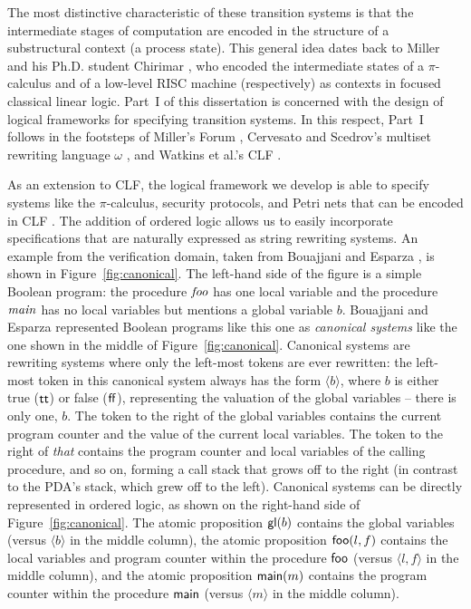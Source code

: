 The most distinctive characteristic of these transition systems is
that the intermediate stages of computation are encoded in the
structure of a substructural context (a process state). This general
idea dates back to Miller \cite{miller92pi} and his Ph.D. student
Chirimar \cite{chirimar95proof}, who encoded the intermediate states
of a $\pi$-calculus and of a low-level RISC machine (respectively) as
contexts in focused classical linear logic.  Part~I of this dissertation
is
concerned with the design of logical frameworks for specifying
transition systems.  In this respect, Part~I follows
in the footsteps of Miller's Forum \cite{miller96forum}, Cervesato and
Scedrov's multiset rewriting language $\omega$
\cite{cervesato09relating}, and Watkins et al.'s CLF
\cite{watkins02concurrent}. 



As an extension to CLF, the logical framework we develop is able to
specify systems like the $\pi$-calculus, security protocols, and Petri
nets that can be encoded in CLF \cite{cervesato02concurrent}. The
addition of ordered logic allows us to easily incorporate
specifications that are naturally expressed as string rewriting
systems.
%
An example from
the verification domain, taken from Bouajjani and Esparza
\cite{bouajjani06rewriting}, is shown in Figure~\ref{fig:canonical}.
The left-hand side of the figure is a simple Boolean program: the
procedure ${\it foo}$ has one local variable and the procedure ${\it
  main}$ has no local variables but mentions a global variable $b$.
Bouajjani and Esparza represented Boolean programs like this one as
{\it canonical systems} like the one shown in the middle of
Figure~\ref{fig:canonical}. Canonical systems are rewriting systems
where only the left-most tokens are ever rewritten: the left-most
token in this canonical system always has the form $\langle b \rangle$,
where $b$ is either true (${\sf tt}$) or false (${\sf ff}$),
representing the valuation of the global variables -- there is only 
one, $b$.  The token to the
right of the global variables contains the current program counter and
the value of the current local variables. The token to the right of
{\it that} contains the program counter and local variables of the calling
procedure, and so on, forming a call stack that grows off to the right
(in contrast to the PDA's stack, which grew off to the left). Canonical
systems can be directly represented in ordered logic, as
shown on the right-hand side of Figure~\ref{fig:canonical}. The atomic
proposition ${\sf gl}(b)$ contains the global variables (versus
$\langle b \rangle$ in the middle column), the atomic proposition
${\sf foo}(l, f)$ contains the local variables and program counter
within the procedure ${\sf foo}$ (versus $\langle l, f \rangle$ in the
middle column), and the atomic proposition ${\sf main}(m)$ contains
the program counter within the procedure ${\sf main}$ (versus $\langle
m \rangle$ in the middle column).

